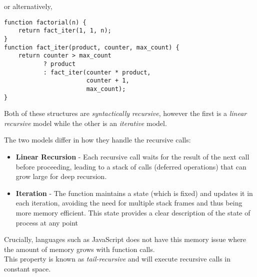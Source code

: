 \documentclass{notes}
\begin{document}
or alternatively,
\begin{verbatim}
function factorial(n) {
    return fact_iter(1, 1, n);
}
function fact_iter(product, counter, max_count) {
    return counter > max_count
           ? product
           : fact_iter(counter * product,
                       counter + 1,
                       max_count);
}
\end{verbatim}

Both of these structures are \emph{syntactically recursive}, however the first is a \emph{linear recursive} model
while the other is an \emph{iterative} model.

The two models differ in how they handle the recursive calls:
\begin{itemize}
    \item \textbf{Linear Recursion} - Each recursive call waits for the result of the next call before proceeding, 
        leading to a stack of calls (deferred operations) that can grow large for deep recursion. 
    \item \textbf{Iteration} - The function maintains a state (which is fixed) and updates it in each iteration, avoiding the need for multiple stack frames and thus being more memory efficient.
        This state provides a clear description of the state of process at any point
\end{itemize}
Crucially, languages such as JavaScript does not have this memory issue where the amount of memory grows with function calls.\\
This property is known as \emph{tail-recursive} and will execute recursive calls in constant space.
\end{document}

